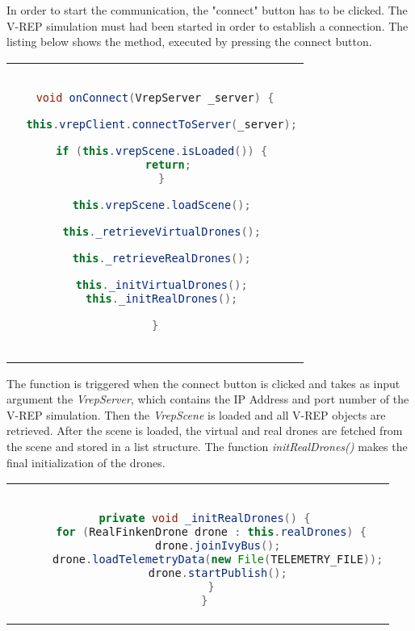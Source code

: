 In order to start the communication, the "connect" button has to be clicked. The V-REP simulation must had been started in order to establish a connection. The listing below shows the method, executed by pressing the connect button.

\begin{center}
\begin{tabular}{c}
\begin{lstlisting}[basicstyle=\small, language=Java, caption={V-REP server connection}]

void onConnect(VrepServer _server) {

  this.vrepClient.connectToServer(_server);

  if (this.vrepScene.isLoaded()) {
    return;
  }

  this.vrepScene.loadScene();

  this._retrieveVirtualDrones();

  this._retrieveRealDrones();

  this._initVirtualDrones();
  this._initRealDrones();

}
        
\end{lstlisting}
\end{tabular}
\end{center}

The function is triggered when the connect button is clicked and takes as input argument the \textit{VrepServer}, which contains the IP Address and port number of the V-REP simulation. Then the \textit{VrepScene} is loaded and all V-REP objects are retrieved. After the scene is loaded, the virtual and real drones are fetched from the scene and stored in a list structure. The function \textit{initRealDrones()} makes the final initialization of the drones.

\begin{center}
\begin{tabular}{c}
\begin{lstlisting}[basicstyle=\small, language=Java, caption={Initializing a mixed-reality FINken}]

  private void _initRealDrones() {
    for (RealFinkenDrone drone : this.realDrones) {
      drone.joinIvyBus();
      drone.loadTelemetryData(new File(TELEMETRY_FILE));
      drone.startPublish();
    }
  }

\end{lstlisting}
\end{tabular}
\end{center}

